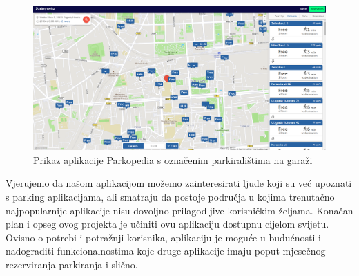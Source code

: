 		\begin{figure}[H]
			\includegraphics[width=\textwidth]{slike/parkopedia_garage.PNG}
			\caption{Prikaz aplikacije Parkopedia s označenim parkiralištima na garaži}
			\label{fig:promjene5} 
		\end{figure}
		
		Vjerujemo da našom aplikacijom možemo zainteresirati ljude koji su već upoznati s parking aplikacijama, ali smatraju da postoje područja u kojima trenutačno najpopularnije aplikacije nisu dovoljno prilagodljive korisničkim željama. Konačan plan i opseg ovog projekta je učiniti ovu aplikaciju dostupnu cijelom svijetu. Ovisno o potrebi i potražnji korisnika, aplikaciju je moguće u budućnosti i nadograditi funkcionalnostima koje druge aplikacije imaju poput mjesečnog rezerviranja parkiranja i slično.

		

		
	